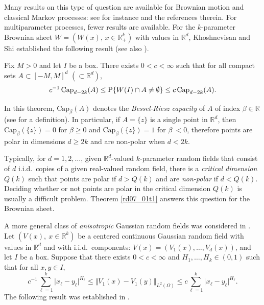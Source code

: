 \documentclass[12pt,a4paper]{article}
\newcommand{\R}{{\mathbb{R}}}
\renewcommand{\P}{\mathrm{P}}
\newcommand{\<}{\langle}
\renewcommand{\>}{\rangle}
\begin{document}
Many results on this type of question are available for Brownian motion and classical Markov processes: see for instance \cite[Chapter 10]{khosh} and the references therein. For multiparameter processes, fewer results are available. For the $k$-parameter Brownian sheet $W = (W(x),\, x \in \R_+^k)$ with values in $\R^d$, Khoshnevisan and Shi \cite{khosh_shi1999} established the following result (see also \cite[Chapter 12]{khosh}).

\begin{theorem}\label{rd07_01t1}
Fix $M >0$ and let $I$ be a box.
There exists $0< c < \infty$ such that for all compact sets $A\subset [-M, M]^d$ $(\subset \R^d)$,
\begin{equation}\label{rd07_01e3}
   c^{-1}\, \mbox{\rm Cap}_{d-2k}(A) \leq \P\{W(I) \cap A \neq \emptyset \} \leq c\, \mbox{\rm Cap}_{d-2k}(A).
\end{equation}
\end{theorem}

In this theorem, $ \mbox{Cap}_{\beta}(A)$ denotes the {\em Bessel-Riesz capacity} of $A$ of index $\beta \in \R$ (see \cite[Chapter 10, Section 3, p.376]{khosh} for a definition). In particular, if $A = \{z\}$ is a single point in $\R^d$, then $\mbox{Cap}_{\beta}(\{z\}) = 0$ for $\beta\geq 0$ and $\mbox{Cap}_{\beta}(\{z\}) = 1$ for $\beta\ < 0$, therefore points are polar in dimensions $d \geq 2k$ and are non-polar when $d < 2k$.

Typically, for $d = 1, 2, \dots$, given $\R^d$-valued $k$-parameter random fields that consist of $d$ i.i.d.~copies of a given real-valued random field, there is a {\em critical dimension} $Q(k)$ such that points {are polar} if $d> Q(k)$ and are {\em non-polar} if $d < Q(k)$. Deciding whether or not points are polar in the critical dimension $Q(k)$ is usually a difficult problem. Theorem \ref{rd07_01t1} answers this question for the Brownian sheet.

 A more general class of {\em anisotropic} Gaussian random fields was considered in \cite{BLX}. Let $(V(x),\ x \in \R^k)$ be a centered continuous Gaussian random field with values in $\R^d$ and with i.i.d.~components: $V(x) = (V_1(x), \dots,V_d(x))$, and let $I$ be a box. Suppose that there exists $0<c<\infty$ and $H_1,\dots,H_k \in (0,1)$ such that for all $x,y \in I$,
\begin{equation}\label{rd07_01c1}
   c^{-1} \sum_{\ell =1}^k \vert x_\ell - y_\ell \vert^{H_\ell} \leq \Vert V_1(x) - V_1(y)\Vert_{L^2(\Omega)}
   \leq c \sum_{\ell =1}^k \vert x_\ell - y_\ell \vert^{H_\ell}.
\end{equation}
The following result was established in \cite{BLX}.
\end{document}
